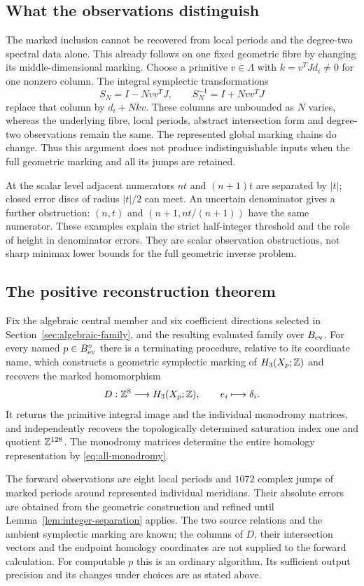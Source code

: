 \subsection{What the observations distinguish}

The marked inclusion cannot be recovered from local periods and the
degree-two spectral data alone. This already follows on one fixed
geometric fibre by changing its middle-dimensional marking. Choose
a primitive $v\in\Lambda$ with $k=v^TJd_i\ne0$ for one nonzero
column. The integral symplectic transformations
\[
 S_N=I-Nvv^TJ,\qquad S_N^{-1}=I+Nvv^TJ
\]
replace that column by $d_i+Nkv$. These columns are unbounded as
$N$ varies, whereas the underlying fibre, local periods, abstract
intersection form and degree-two observations remain the same.
The represented global marking chains do change. Thus this argument
does not produce indistinguishable inputs when the full geometric
marking and all its jumps are retained.

At the scalar level adjacent numerators $nt$ and $(n+1)t$ are
separated by $|t|$; closed error discs of radius $|t|/2$ can meet.
An uncertain denominator gives a further obstruction: $(n,t)$ and
$(n+1,nt/(n+1))$ have the same numerator. These examples explain the
strict half-integer threshold and the role of height in denominator
errors. They are scalar observation obstructions, not sharp minimax
lower bounds for the full geometric inverse problem.

\subsection{The positive reconstruction theorem}

\begin{theorem}\label{thm:integral-reconstruction}
Fix the algebraic central member and six coefficient directions
selected in Section~\ref{sec:algebraic-family}, and the resulting
evaluated family over $B_{\rm ev}$.
For every named $p\in B_{\rm ev}^{\circ}$ there is a terminating
procedure, relative to its coordinate name, which constructs a
geometric symplectic marking of $H_3(X_p;\mathbb Z)$ and recovers the
marked homomorphism
\[
 D:\mathbb Z^8\longrightarrow H_3(X_p;\mathbb Z),\qquad e_i\longmapsto\delta_i.
\]
It returns the primitive integral image and the individual
monodromy matrices, and independently recovers the topologically
determined saturation index one and quotient $\mathbb Z^{128}$.
The monodromy matrices determine the entire homology
representation by \eqref{eq:all-monodromy}.

The forward observations are eight local periods and $1072$
complex jumps of marked periods around represented individual
meridians. Their absolute errors are obtained from the geometric
construction and refined until
Lemma~\ref{lem:integer-separation} applies. The two source relations
and the ambient symplectic marking are known; the columns of $D$,
their intersection vectors and the endpoint homology coordinates
are not supplied to the forward calculation. For computable $p$
this is an ordinary algorithm. Its sufficient output precision and
its changes under choices are as stated above.
\end{theorem}

